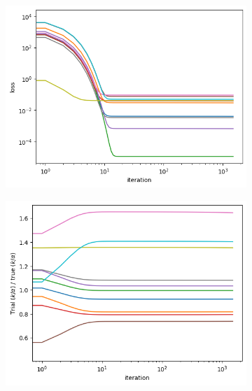 \documentclass[]{article}
\begin{document}
\begin{appendices}
\begin{figure}[H]
	\caption{Gradient descent performance profile, displaced from the origin}
	\begin{subfigure}{.5\textwidth}
		\centering
		\includegraphics[scale=0.40]{loss-vs-iteration-father-away.png}
		\label{subfig:convergence-loss-father-away}
	\end{subfigure}
	\begin{subfigure}{.5\textwidth}
		\centering
		\includegraphics[scale=0.40]{k-a-ratio-father-away.png}
		\label{subfig:convergence-ratio-farther-away}
	\end{subfigure}
	\label{fig:convergence-farther-away}
\end{figure}


\end{appendices}
\end{document}
